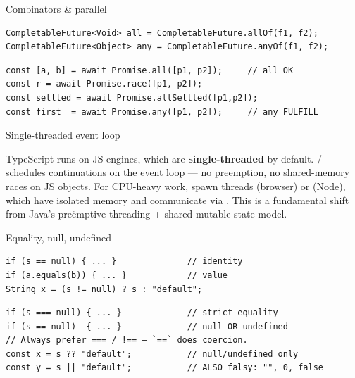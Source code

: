 \documentclass[10pt]{article}
\begin{document}
\begin{construct}{Combinators \& parallel}
\noindent
\begin{minipage}[t]{0.485\linewidth}
\begin{lstlisting}[style=java, title=Java]
CompletableFuture<Void> all = CompletableFuture.allOf(f1, f2);
CompletableFuture<Object> any = CompletableFuture.anyOf(f1, f2);
\end{lstlisting}
\end{minipage}\hfill
\begin{minipage}[t]{0.485\linewidth}
\begin{lstlisting}[style=ts, title=TypeScript]
const [a, b] = await Promise.all([p1, p2]);     // all OK
const r = await Promise.race([p1, p2]);
const settled = await Promise.allSettled([p1,p2]);
const first  = await Promise.any([p1, p2]);     // any FULFILL
\end{lstlisting}
\end{minipage}
\end{construct}

\begin{construct}{Single-threaded event loop}
\noindent
\begin{minipage}[t]{\linewidth}
\small
TypeScript runs on JS engines, which are \textbf{single-threaded} by default.
/ schedules continuations on the event loop --- no
preemption, no shared-memory races on JS objects. For CPU-heavy work, spawn
 threads (browser) or  (Node), which have
isolated memory and communicate via . This is a fundamental
shift from Java's pre\"emptive threading + shared mutable state model.
\end{minipage}
\end{construct}


\begin{construct}{Equality, null, undefined}
\noindent
\begin{minipage}[t]{0.485\linewidth}
\begin{lstlisting}[style=java, title=Java]
if (s == null) { ... }              // identity
if (a.equals(b)) { ... }            // value
String x = (s != null) ? s : "default";
\end{lstlisting}
\end{minipage}\hfill
\begin{minipage}[t]{0.485\linewidth}
\begin{lstlisting}[style=ts, title=TypeScript]
if (s === null) { ... }             // strict equality
if (s == null)  { ... }             // null OR undefined
// Always prefer === / !== — `==` does coercion.
const x = s ?? "default";           // null/undefined only
const y = s || "default";           // ALSO falsy: "", 0, false
\end{lstlisting}
\end{minipage}
\end{construct}
\end{document}
